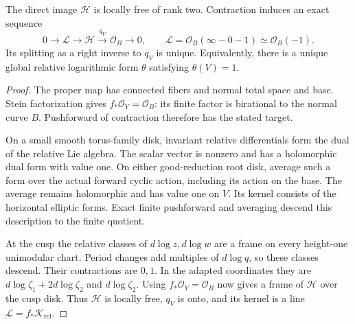 \begin{theorem}\label{nf:thm:relative-line}
The direct image $\mathcal H$ is locally free of rank two.
Contraction induces an exact sequence
\begin{equation}\label{nf:eq:H-sequence}
 0\longrightarrow\mathcal L
 \longrightarrow\mathcal H\xrightarrow{\ q_V\ }\mathcal O_B
 \longrightarrow0,\qquad
 \mathcal L=\mathcal O_B(\infty-0-1)\simeq\mathcal O_B(-1).
\end{equation}
Its splitting as a right inverse to $q_V$ is unique.
Equivalently, there is a unique global relative logarithmic form
$\theta$ satisfying $\theta(V)=1$.
\end{theorem}

\begin{proof}
The proper map has connected fibers and normal total space and
base. Stein factorization gives $f_*\mathcal O_Y=\mathcal O_B$:
its finite factor is birational to the normal curve $B$.
Pushforward of contraction therefore has the stated target.

On a small smooth torus-family disk, invariant relative
differentials form the dual of the relative Lie algebra.
The scalar vector is nonzero and has a holomorphic dual form
with value one. On either good-reduction root disk, average such
a form over the actual forward cyclic action, including its
action on the base. The average remains holomorphic and has value
one on $V$. Its kernel consists of the horizontal elliptic forms.
Exact finite pushforward and averaging descend this description
to the finite quotient.

At the cusp the relative classes of $d\log z,d\log w$ are a
frame on every height-one unimodular chart. Period changes add
multiples of $d\log q$, so these classes descend. Their
contractions are $0,1$. In the adapted coordinates they are
$d\log\zeta_1+2d\log\zeta_2$ and $d\log\zeta_2$.
Using $f_*\mathcal O_Y=\mathcal O_B$ now gives a frame of
$\mathcal H$ over the cusp disk. Thus $\mathcal H$ is locally
free, $q_V$ is onto, and its kernel is a line
$\mathcal L=f_*\mathcal K_{\mathrm{rel}}$.


\end{proof}
